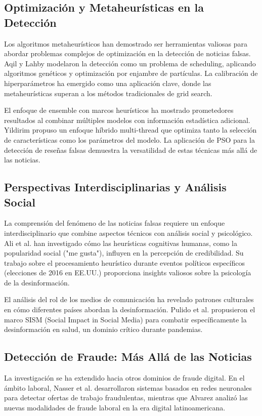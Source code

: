 \subsection{Optimización y Metaheurísticas en la Detección}
Los algoritmos metaheurísticos han demostrado ser herramientas valiosas para abordar problemas complejos de optimización en la detección de noticias falsas. Aqil y Lahby \cite{aqil2021modeling} modelaron la detección como un problema de scheduling, aplicando algoritmos genéticos y optimización por enjambre de partículas. La calibración de hiperparámetros \cite{bacanin2023benefits, hurtado2024calibracion} ha emergido como una aplicación clave, donde las metaheurísticas superan a los métodos tradicionales de grid search.

El enfoque de ensemble con marcos heurísticos \cite{das2022heuristic} ha mostrado prometedores resultados al combinar múltiples modelos con información estadística adicional. Yildirim \cite{yildirim2023novel} propuso un enfoque híbrido multi-thread que optimiza tanto la selección de características como los parámetros del modelo. La aplicación de PSO para la detección de reseñas falsas \cite{deshai2023unmasking} demuestra la versatilidad de estas técnicas más allá de las noticias.

\subsection{Perspectivas Interdisciplinarias y Análisis Social}
La comprensión del fenómeno de las noticias falsas requiere un enfoque interdisciplinario que combine aspectos técnicos con análisis social y psicológico. Ali et al. \cite{ali2021fake, ali2020posttruth} han investigado cómo las heurísticas cognitivas humanas, como la popularidad social ("me gusta"), influyen en la percepción de credibilidad. Su trabajo sobre el procesamiento heurístico durante eventos políticos específicos (elecciones de 2016 en EE.UU.) proporciona insights valiosos sobre la psicología de la desinformación.

El análisis del rol de los medios de comunicación \cite{carcamo2021fake, perez2020fake} ha revelado patrones culturales en cómo diferentes países abordan la desinformación. Pulido et al. \cite{pulido2020new} propusieron el marco SISM (Social Impact in Social Media) para combatir específicamente la desinformación en salud, un dominio crítico durante pandemias.

\subsection{Detección de Fraude: Más Allá de las Noticias}
La investigación se ha extendido hacia otros dominios de fraude digital. En el ámbito laboral, Nasser et al. \cite{nasser2021online} desarrollaron sistemas basados en redes neuronales para detectar ofertas de trabajo fraudulentas, mientras que Alvarez \cite{alvarez2021fraude} analizó las nuevas modalidades de fraude laboral en la era digital latinoamericana.

